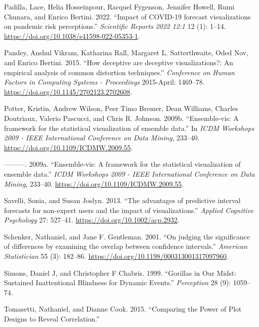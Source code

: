 \documentclass[
  letterpaper,
  DIV=11,
  numbers=noendperiod]{scrartcl}
\newlength{\cslhangindent}
\newlength{\cslentryspacingunit} %
\newenvironment{CSLReferences}[2] %
 {%
  \setlength{\parindent}{0pt}
  \ifodd #1
  \let\oldpar\par
  \def\par{\hangindent=\cslhangindent\oldpar}
  \fi
  \setlength{\parskip}{#2\cslentryspacingunit}
 }%
 {}
\begin{document}
\begin{CSLReferences}{1}{0}
\leavevmode{}%
Padilla, Lace, Helia Hosseinpour, Racquel Fygenson, Jennifer Howell,
Rumi Chunara, and Enrico Bertini. 2022. {``{Impact of COVID-19 forecast
visualizations on pandemic risk perceptions}.''} \emph{Scientific
Reports 2022 12:1} 12 (1): 1--14.
\url{https://doi.org/10.1038/s41598-022-05353-1}.

\leavevmode{}%
Pandey, Anshul Vikram, Katharina Rall, Margaret L. Satterthwaite, Oded
Nov, and Enrico Bertini. 2015. {``{How deceptive are deceptive
visualizations?: An empirical analysis of common distortion
techniques}.''} \emph{Conference on Human Factors in Computing Systems -
Proceedings} 2015-April: 1469--78.
\url{https://doi.org/10.1145/2702123.2702608}.

\leavevmode{}%
Potter, Kristin, Andrew Wilson, Peer Timo Bremer, Dean Williams, Charles
Doutriaux, Valerio Pascucci, and Chris R. Johnson. 2009b.
{``{Ensemble-vis: A framework for the statistical visualization of
ensemble data}.''} In \emph{ICDM Workshops 2009 - IEEE International
Conference on Data Mining}, 233--40.
\url{https://doi.org/10.1109/ICDMW.2009.55}.

\leavevmode{}%
---------. 2009a. {``{Ensemble-vis: A framework for the statistical
visualization of ensemble data}.''} \emph{ICDM Workshops 2009 - IEEE
International Conference on Data Mining}, 233--40.
\url{https://doi.org/10.1109/ICDMW.2009.55}.

\leavevmode{}%
Savelli, Sonia, and Susan Joslyn. 2013. {``{The advantages of predictive
interval forecasts for non-expert users and the impact of
visualizations}.''} \emph{Applied Cognitive Psychology} 27: 527--41.
\url{https://doi.org/10.1002/acp.2932}.

\leavevmode{}%
Schenker, Nathaniel, and Jane F. Gentleman. 2001. {``{On judging the
significance of differences by examining the overlap between confidence
intervals}.''} \emph{American Statistician} 55 (3): 182--86.
\url{https://doi.org/10.1198/000313001317097960}.

\leavevmode{}%
Simons, Daniel J, and Christopher F Chabris. 1999. {``Gorillas in Our
Midst: Sustained Inattentional Blindness for Dynamic Events.''}
\emph{Perception} 28 (9): 1059--74.

\leavevmode{}%
Tomasetti, Nathaniel, and Dianne Cook. 2015. {``{Comparing the Power of
Plot Designs to Reveal Correlation}.''}


\end{CSLReferences}
\end{document}
